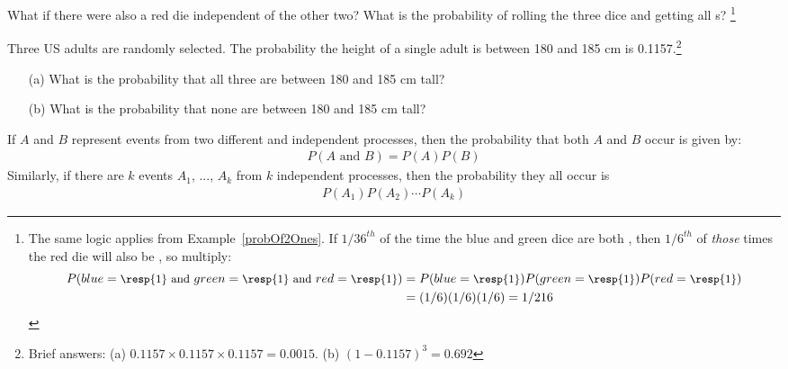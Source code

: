 \begin{exercise}{What if there were also a red die independent of the other two? What is the probability of rolling the three dice and getting all s?}\label{threeDice}
\footnote{The same logic applies from Example~\ref{probOf2Ones}. If $1/36^{th}$ of the time the blue and green dice are both , then $1/6^{th}$ of \emph{those} times the red die will also be , so multiply:
{\begin{align*}
P(blue=\text{\small\resp{1} and } green=\text{\small\resp{1} and } red=\text{\small\resp{1}})
	&= P(blue=\text{\small\resp{1}}) P(green=\text{\small\resp{1}}) P(red=\text{\small\resp{1}}) \\
	&= (1/6) (1/6) (1/6)
	= 1/216
\end{align*}} \vspace{-3mm}
}
\end{exercise}

\begin{exercise}
	Three US adults are randomly selected. The probability the height of a single adult is between 180 and 185 cm is 0.1157.\footnote{Brief answers: (a) $0.1157 \times 0.1157 \times 0.1157 = 0.0015$. (b) $(1-0.1157)^3 = 0.692$} \vspace{-1.5mm}
	\begin{enumerate}
		\setlength{\itemsep}{0mm}
		\item[(a)] What is the probability that all three are between 180 and 185 cm tall?
		\item[(b)] What is the probability that none are between 180 and 185 cm tall?
	\end{enumerate}
\end{exercise}

\begin{termBox}{
If $A$ and $B$ represent events from two different and independent processes, then the probability that both $A$ and $B$ occur is given by: \vspace{-1.5mm}
\begin{eqnarray}\label{eqForIndependentEvents}
P(A \text{ and }B) = P(A)  P(B)
\end{eqnarray}
Similarly, if there are $k$ events $A_1$, ..., $A_k$ from $k$ independent processes, then the probability they all occur is\vspace{-1.5mm}
\begin{eqnarray*}
P(A_1) P(A_2) \cdots P(A_k)
\end{eqnarray*}\vspace{-6mm}}
\end{termBox}

